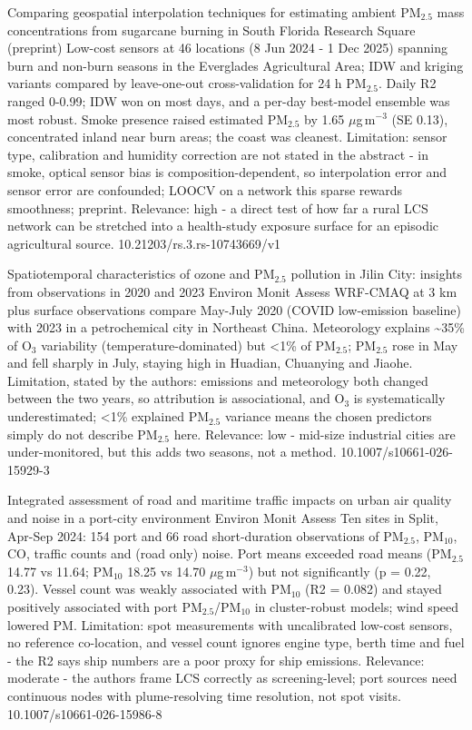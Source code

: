 \documentclass[10pt]{article}
\begin{document}
{Comparing geospatial interpolation techniques for estimating ambient PM$_{2.5}$ mass concentrations from sugarcane burning in South Florida}
{Research Square (preprint)}
{Low-cost sensors at 46 locations (8 Jun 2024 - 1 Dec 2025) spanning burn and non-burn seasons in the Everglades Agricultural Area; IDW and kriging variants compared by leave-one-out cross-validation for 24 h PM$_{2.5}$. Daily R2 ranged 0-0.99; IDW won on most days, and a per-day best-model ensemble was most robust. Smoke presence raised estimated PM$_{2.5}$ by 1.65 $\mu$g\,m$^{-3}$ (SE 0.13), concentrated inland near burn areas; the coast was cleanest. Limitation: sensor type, calibration and humidity correction are not stated in the abstract - in smoke, optical sensor bias is composition-dependent, so interpolation error and sensor error are confounded; LOOCV on a network this sparse rewards smoothness; preprint. Relevance: high - a direct test of how far a rural LCS network can be stretched into a health-study exposure surface for an episodic agricultural source.}
{10.21203/rs.3.rs-10743669/v1}

{Spatiotemporal characteristics of ozone and PM$_{2.5}$ pollution in Jilin City: insights from observations in 2020 and 2023}
{Environ Monit Assess}
{WRF-CMAQ at 3 km plus surface observations compare May-July 2020 (COVID low-emission baseline) with 2023 in a petrochemical city in Northeast China. Meteorology explains \textasciitilde{}35\% of O$_3$ variability (temperature-dominated) but <1\% of PM$_{2.5}$; PM$_{2.5}$ rose in May and fell sharply in July, staying high in Huadian, Chuanying and Jiaohe. Limitation, stated by the authors: emissions and meteorology both changed between the two years, so attribution is associational, and O$_3$ is systematically underestimated; <1\% explained PM$_{2.5}$ variance means the chosen predictors simply do not describe PM$_{2.5}$ here. Relevance: low - mid-size industrial cities are under-monitored, but this adds two seasons, not a method.}
{10.1007/s10661-026-15929-3}

{Integrated assessment of road and maritime traffic impacts on urban air quality and noise in a port-city environment}
{Environ Monit Assess}
{Ten sites in Split, Apr-Sep 2024: 154 port and 66 road short-duration observations of PM$_{2.5}$, PM$_{10}$, CO, traffic counts and (road only) noise. Port means exceeded road means (PM$_{2.5}$ 14.77 vs 11.64; PM$_{10}$ 18.25 vs 14.70 $\mu$g\,m$^{-3}$) but not significantly (p = 0.22, 0.23). Vessel count was weakly associated with PM$_{10}$ (R2 = 0.082) and stayed positively associated with port PM$_{2.5}$/PM$_{10}$ in cluster-robust models; wind speed lowered PM. Limitation: spot measurements with uncalibrated low-cost sensors, no reference co-location, and vessel count ignores engine type, berth time and fuel - the R2 says ship numbers are a poor proxy for ship emissions. Relevance: moderate - the authors frame LCS correctly as screening-level; port sources need continuous nodes with plume-resolving time resolution, not spot visits.}
{10.1007/s10661-026-15986-8}
\end{document}
